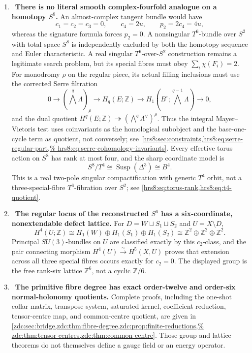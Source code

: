 \begin{enumerate}[leftmargin=1.8em,itemsep=.65em]
\item \Refuted\ \textbf{There is no literal smooth complex-fourfold
analogue on a homotopy \(S^8\).}
An almost-complex tangent bundle would have
\[
 c_1=c_2=c_3=0,\qquad c_4=2u,\qquad p_2=2c_4=4u,
\]
whereas the signature formula forces \(p_2=0\).  A nonsingular
\(T^6\)-bundle over \(S^2\) with total space \(S^8\) is independently
excluded by both the homotopy sequence and Euler characteristic.  A real
singular \(T^6\)-over-\(S^2\) construction remains a legitimate search
problem, but its special fibres must obey
\(\sum_i\chi(F_i)=2\).  For monodromy \(\rho\) on the regular piece, its
actual filling inclusions must use the corrected Serre filtration
\[
 0\longrightarrow(\textstyle\bigwedge^q\Lambda)_\rho
 \longrightarrow H_q(E;\mathbb Z)
 \longrightarrow
 H_1(B^\circ;\textstyle\bigwedge^{q-1}\Lambda)
 \longrightarrow0,
\]
and the dual quotient
\(H^q(E;\mathbb Z)\twoheadrightarrow
(\bigwedge^q\Lambda^\vee)^\rho\).  Thus the integral Mayer--Vietoris test
uses coinvariants as the homological subobject and the base-one-cycle term
as quotient, not conversely; see
\cref{hrs8:sec:constraints,hrs8:eq:serre-regular-part,%
 hrs8:eq:serre-cohomology-invariants}.  Every effective torus action on
\(S^8\) has rank at most four, and the sharp coordinate model is
\[
 S^8/T^4\cong\operatorname{Susp}(\Delta^3)\cong B^4.
\]
This is a real two-pole singular compactification with generic \(T^4\)
orbit, not a three-special-fibre \(T^6\)-fibration over \(S^2\); see
\cref{hrs8:eq:torus-rank,hrs8:eq:t4-quotient}.

\item \Verified\ \textbf{The regular locus of the reconstructed \(S^6\)
has a six-coordinate, nonextendable defect lattice.}
For \(D=W\sqcup S_1\sqcup S_2\) and \(U=X\setminus D\),
\[
 \boxed{H^4(U;\mathbb Z)
 \cong H_1(W)\oplus H_1(S_1)\oplus H_1(S_2)
 \cong\mathbb Z^2\oplus\mathbb Z^2\oplus\mathbb Z^2.}
\]
Principal \(SU(3)\)-bundles on \(U\) are classified exactly by this
\(c_2\)-class, and the pair connecting morphism
\(H^4(U)\xrightarrow{\sim}H^5(X,U)\) proves that extension across all
three special fibres occurs exactly for \(c_2=0\).  The displayed group is
the free rank-six lattice \(\mathbb Z^6\), not a cyclic \(\mathbb Z/6\).

\item \Verified\ \textbf{The primitive fibre degree has exact order-twelve
and order-six normal-holonomy quotients.}  Complete proofs, including the
one-shot collar matrix, transpose system, saturated kernel, coefficient
reduction, tensor-centre map, and common-centre quotient, are given in
\cref{zdc:sec:bridge,zdc:thm:fibre-degree,zdc:prop:finite-reductions,%
zdc:thm:tensor-centres,zdc:thm:common-centre}.  Those group and lattice
theorems do not themselves define a gauge field or an energy operator.


\end{enumerate}
